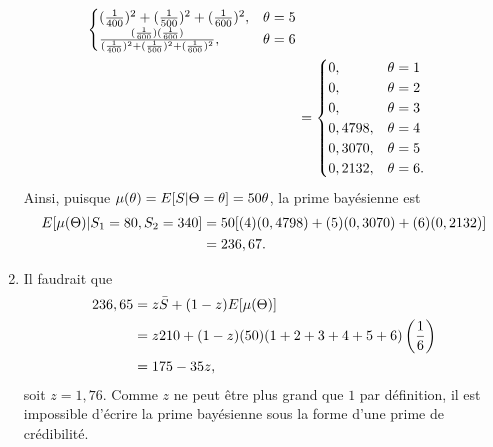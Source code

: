 \begin{exercice}
\begin{sol}
\begin{enumerate}
\begin{align*}
\begin{cases}
{            (\frac{1}{400})^2 + (\frac{1}{500})^2 + (\frac{1}{600})^2},
          & \theta = 5 \\
          \frac{(\frac{1}{600})(\frac{1}{600})}{%
            (\frac{1}{400})^2 + (\frac{1}{500})^2 + (\frac{1}{600})^2},
          & \theta = 6 \\
        \end{cases} \\
        &=
        \begin{cases}
          0, & \theta = 1 \\
          0, & \theta = 2 \\
          0, & \theta = 3 \\
          0,4798, & \theta = 4 \\
          0,3070, & \theta = 5 \\
          0,2132, & \theta = 6.
        \end{cases}
      \end{align*}
      Ainsi, puisque $\mu(\theta) = E [ S|\Theta = \theta ] = 50
      \theta$, la prime bayésienne est
      \begin{align*}
        E [ \mu(\Theta)|S_1 = 80, S_2 = 340 ]
        &=50 [(4)(0,4798) + (5)(0,3070) + (6)(0,2132)] \\
        &= 236,67.
      \end{align*}
    \item Il faudrait que
      \begin{align*}
        236,65
        &= z \bar{S} + (1 - z) E [ \mu(\Theta) ] \\
        &= z 210 + (1 - z)(50)(1 + 2 + 3 + 4 + 5 + 6)
        \left(
          \frac{1}{6}
        \right) \\
        &= 175 - 35 z,
      \end{align*}
      soit $z = 1,76$. Comme $z$ ne peut être plus grand que $1$ par
      définition, il est impossible d'écrire la prime bayésienne sous
      la forme d'une prime de crédibilité.
    \end{enumerate}
  \end{sol}
\end{exercice}

